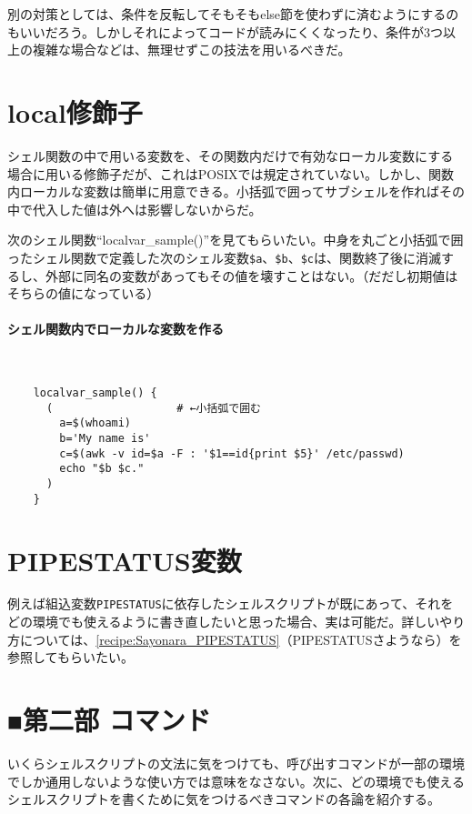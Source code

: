 別の対策としては、条件を反転してそもそもelse節を使わずに済むようにするのもいいだろう。しかしそれによってコードが読みにくくなったり、条件が3つ以上の複雑な場合などは、無理せずこの技法を用いるべきだ。

\section{local修飾子}
\label{allenvs:local_keyword}

シェル関数の中で用いる変数を、その関数内だけで有効なローカル変数にする場合に用いる修飾子だが、これはPOSIXでは規定されていない。しかし、関数内ローカルな変数は簡単に用意できる。小括弧で囲ってサブシェルを作ればその中で代入した値は外へは影響しないからだ。

次のシェル関数``localvar\_{}sample()''を見てもらいたい。中身を丸ごと小括弧で囲ったシェル関数で定義した次のシェル変数\verb|$a|、\verb|$b|、\verb|$c|は、関数終了後に消滅するし、外部に同名の変数があってもその値を壊すことはない。（だだし初期値はそちらの値になっている）

\paragraph{シェル関数内でローカルな変数を作る} 　\\
\begin{frameboxit}{160.0mm}
\begin{verbatim}
	localvar_sample() {
	  (                   # ←小括弧で囲む
	    a=$(whoami)
	    b='My name is'
	    c=$(awk -v id=$a -F : '$1==id{print $5}' /etc/passwd)
	    echo "$b $c."
	  )
	}
\end{verbatim}
\end{frameboxit}

\section{PIPESTATUS変数}

例えば組込変数\verb|PIPESTATUS|に依存したシェルスクリプトが既にあって、それをどの環境でも使えるように書き直したいと思った場合、実は可能だ。詳しいやり方については、\ref{recipe:Sayonara_PIPESTATUS}（PIPESTATUSさようなら）を参照してもらいたい。

\section*{■第二部 コマンド}

いくらシェルスクリプトの文法に気をつけても、呼び出すコマンドが一部の環境でしか通用しないような使い方では意味をなさない。次に、どの環境でも使えるシェルスクリプトを書くために気をつけるべきコマンドの各論を紹介する。

